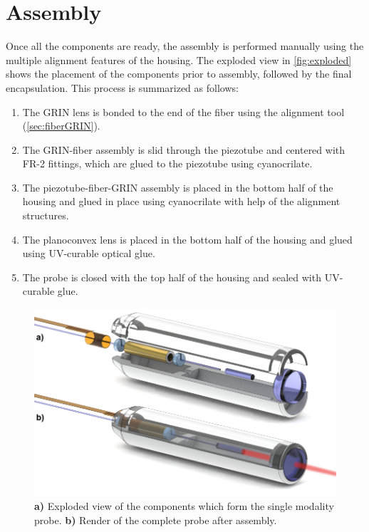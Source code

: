 \documentclass[10pt]{iopart}
\begin{document}
\section{Assembly}

Once all the components are ready, the assembly is performed manually using the multiple alignment features of the housing. The exploded view in \autoref{fig:exploded} shows the placement of the components prior to assembly, followed by the final encapsulation. This process is summarized as follows:

\begin{enumerate}
\item The GRIN lens is bonded to the end of the fiber using the alignment tool (\autoref{sec:fiberGRIN}).
\item The GRIN-fiber assembly is slid through the piezotube and centered with FR-2 fittings, which are glued to the piezotube using cyanocrilate.
\item The piezotube-fiber-GRIN assembly is placed in the bottom half of the housing and glued in place using cyanocrilate with help of the alignment structures.
\item The planoconvex lens is placed in the bottom half of the housing and glued using UV-curable optical glue.
\item The probe is closed with the top half of the housing and sealed with UV-curable glue.
\end{enumerate}

\begin{figure}[h!]\centering \includegraphics[width=\columnwidth]{figures/explodedRenderLaser.pdf}
      \caption{\textbf{a)} Exploded view of the components which form the single modality probe.
      \textbf{b)} Render of the complete probe after assembly.}
      \label{fig:exploded}
\end{figure}
\end{document}
